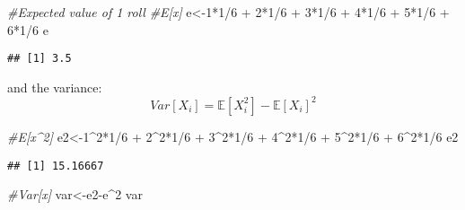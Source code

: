 \documentclass[
]{article}
\newenvironment{Shaded}{\begin{snugshade}}{\end{snugshade}}
\newcommand{\CommentTok}[1]{\textcolor[rgb]{0.56,0.35,0.01}{\textit{#1}}}
\newcommand{\DecValTok}[1]{\textcolor[rgb]{0.00,0.00,0.81}{#1}}
\newcommand{\NormalTok}[1]{#1}
\newcommand{\OtherTok}[1]{\textcolor[rgb]{0.56,0.35,0.01}{#1}}
\newcommand{\SpecialCharTok}[1]{\textcolor[rgb]{0.00,0.00,0.00}{#1}}
\begin{document}
\begin{Shaded}
\begin{Highlighting}[]
\CommentTok{\#Expected value of 1 roll}
\CommentTok{\#E[x]}
\NormalTok{e}\OtherTok{\textless{}{-}}\DecValTok{1}\SpecialCharTok{*}\DecValTok{1}\SpecialCharTok{/}\DecValTok{6} \SpecialCharTok{+} \DecValTok{2}\SpecialCharTok{*}\DecValTok{1}\SpecialCharTok{/}\DecValTok{6} \SpecialCharTok{+} \DecValTok{3}\SpecialCharTok{*}\DecValTok{1}\SpecialCharTok{/}\DecValTok{6} \SpecialCharTok{+} \DecValTok{4}\SpecialCharTok{*}\DecValTok{1}\SpecialCharTok{/}\DecValTok{6} \SpecialCharTok{+} \DecValTok{5}\SpecialCharTok{*}\DecValTok{1}\SpecialCharTok{/}\DecValTok{6} \SpecialCharTok{+} \DecValTok{6}\SpecialCharTok{*}\DecValTok{1}\SpecialCharTok{/}\DecValTok{6}
\NormalTok{e}
\end{Highlighting}
\end{Shaded}

\begin{verbatim}
## [1] 3.5
\end{verbatim}

and the variance: \[Var[X_i]=\mathbb E[X_i^2]-\mathbb E[X_i]^2\]

\begin{Shaded}
\begin{Highlighting}[]
\CommentTok{\#E[x\^{}2]}
\NormalTok{e2}\OtherTok{\textless{}{-}}\DecValTok{1}\SpecialCharTok{\^{}}\DecValTok{2}\SpecialCharTok{*}\DecValTok{1}\SpecialCharTok{/}\DecValTok{6} \SpecialCharTok{+} \DecValTok{2}\SpecialCharTok{\^{}}\DecValTok{2}\SpecialCharTok{*}\DecValTok{1}\SpecialCharTok{/}\DecValTok{6} \SpecialCharTok{+} \DecValTok{3}\SpecialCharTok{\^{}}\DecValTok{2}\SpecialCharTok{*}\DecValTok{1}\SpecialCharTok{/}\DecValTok{6} \SpecialCharTok{+} \DecValTok{4}\SpecialCharTok{\^{}}\DecValTok{2}\SpecialCharTok{*}\DecValTok{1}\SpecialCharTok{/}\DecValTok{6} \SpecialCharTok{+} \DecValTok{5}\SpecialCharTok{\^{}}\DecValTok{2}\SpecialCharTok{*}\DecValTok{1}\SpecialCharTok{/}\DecValTok{6} \SpecialCharTok{+} \DecValTok{6}\SpecialCharTok{\^{}}\DecValTok{2}\SpecialCharTok{*}\DecValTok{1}\SpecialCharTok{/}\DecValTok{6}
\NormalTok{e2}
\end{Highlighting}
\end{Shaded}

\begin{verbatim}
## [1] 15.16667
\end{verbatim}

\begin{Shaded}
\begin{Highlighting}[]
\CommentTok{\#Var[x]}
\NormalTok{var}\OtherTok{\textless{}{-}}\NormalTok{e2}\SpecialCharTok{{-}}\NormalTok{e}\SpecialCharTok{\^{}}\DecValTok{2}
\NormalTok{var}
\end{Highlighting}
\end{Shaded}
\end{document}
